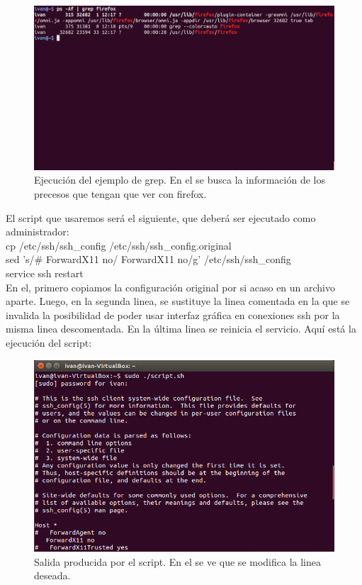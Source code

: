 \begin{itemize}
	\begin{figure}[H]
		\centering
		\includegraphics[width=0.7\linewidth]{EjemploGrep}
		\caption[Ejemplo grep]{Ejecución del ejemplo de grep. En el se busca la información de los precesos que tengan que ver con firefox.}
		\label{fig:EjemploGrep}
	\end{figure}
	
	El script que usaremos será el siguiente, que deberá ser ejecutado como administrador:\\
	
	
	cp /etc/ssh/ssh\_config /etc/ssh/ssh\_config.original\\
	sed 's/\#   ForwardX11 no/   ForwardX11 no/g' /etc/ssh/ssh\_config\\
	service ssh restart\\
	
	
	En el, primero copiamos la configuración original por si acaso en un archivo aparte. Luego, en la segunda linea, se sustituye la linea comentada en la que se invalida la posibilidad de poder usar interfaz gráfica en conexiones ssh por la misma linea descomentada. En la última linea se reinicia el servicio. Aquí está la ejecución del script:\\
	
	\begin{figure}[H]
		\centering
		\includegraphics[width=0.7\linewidth]{SalidaScript}
		\caption[Salida script]{Salida producida por el script. En el se ve que se modifica la linea deseada.}
		\label{fig:SalidaScript}
	\end{figure}
	

\end{itemize}
